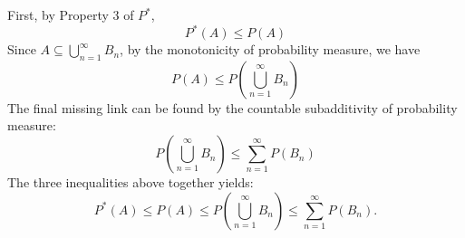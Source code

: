 \documentclass[12pt]{article}
\begin{document}
\begin{problem}[4]
	First, by Property 3 of $P^*$, 
	\begin{equation}
	P^*(A) \leq P(A)
        \end{equation}
	Since $A \subseteq \bigcup_{n =1}^{\infty} B_n$, by the monotonicity of probability measure, we have 
	\begin{equation}
		P(A) \leq P\left( \bigcup_{n =1}^{\infty} B_n \right) 
	\end{equation}
	The final missing link can be found by the countable subadditivity of probability measure:
	\begin{equation}
		P\left( \bigcup_{n =1}^{\infty} B_n \right) \leq \sum_{ n=1}^{\infty} P(B_n)
	\end{equation}
The three inequalities above together yields:
\[
	P^* (A) \leq P(A) \leq P\left( \bigcup_{n =1}^{\infty} B_n \right) \leq \sum_{ n=1}^{\infty} P(B_n)
.\] 
\end{problem}
\end{document}
